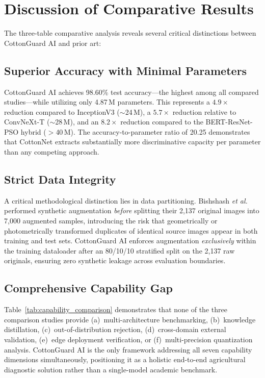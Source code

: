 \documentclass[journal,10pt,twocolumn]{IEEEtran}
\begin{document}
\section*{Discussion of Comparative Results}

The three-table comparative analysis reveals several critical distinctions between CottonGuard AI and prior art:

\subsection*{Superior Accuracy with Minimal Parameters}
CottonGuard AI achieves 98.60\% test accuracy---the highest among all compared studies---while utilizing only 4.87\,M parameters. This represents a $4.9\times$ reduction compared to InceptionV3 ($\sim$24\,M), a $5.7\times$ reduction relative to ConvNeXt-T ($\sim$28\,M), and an $8.2\times$ reduction compared to the BERT-ResNet-PSO hybrid ($>$40\,M). The accuracy-to-parameter ratio of 20.25 demonstrates that CottonNet extracts substantially more discriminative capacity per parameter than any competing approach.

\subsection*{Strict Data Integrity}
A critical methodological distinction lies in data partitioning. Bishshash \emph{et al.}~\cite{bishshash2024sar} performed synthetic augmentation \emph{before} splitting their 2,137 original images into 7,000 augmented samples, introducing the risk that geometrically or photometrically transformed duplicates of identical source images appear in both training and test sets. CottonGuard AI enforces augmentation \emph{exclusively} within the training dataloader after an 80/10/10 stratified split on the 2,137 raw originals, ensuring zero synthetic leakage across evaluation boundaries.

\subsection*{Comprehensive Capability Gap}
Table~\ref{tab:capability_comparison} demonstrates that none of the three comparison studies provide (a)~multi-architecture benchmarking, (b)~knowledge distillation, (c)~out-of-distribution rejection, (d)~cross-domain external validation, (e)~edge deployment verification, or (f)~multi-precision quantization analysis. CottonGuard AI is the only framework addressing all seven capability dimensions simultaneously, positioning it as a holistic end-to-end agricultural diagnostic solution rather than a single-model academic benchmark.
\end{document}
